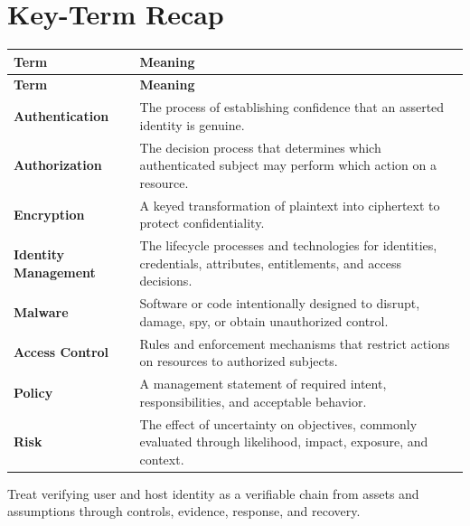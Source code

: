 \documentclass[11pt]{article}
\begin{document}
\section*{Key-Term Recap}
\begin{longtable}{>{\RaggedRight\arraybackslash}p{}>{\RaggedRight\arraybackslash}p{}}
\toprule\rowcolor{Navy}\color{white}\textbf{Term} & \color{white}\textbf{Meaning}\\\midrule
\endfirsthead
\toprule\rowcolor{Navy}\color{white}\textbf{Term} & \color{white}\textbf{Meaning}\\\midrule
\endhead
\textbf{Authentication} & The process of establishing confidence that an asserted identity is genuine. \\\midrule
\textbf{Authorization} & The decision process that determines which authenticated subject may perform which action on a resource. \\\midrule
\textbf{Encryption} & A keyed transformation of plaintext into ciphertext to protect confidentiality. \\\midrule
\textbf{Identity Management} & The lifecycle processes and technologies for identities, credentials, attributes, entitlements, and access decisions. \\\midrule
\textbf{Malware} & Software or code intentionally designed to disrupt, damage, spy, or obtain unauthorized control. \\\midrule
\textbf{Access Control} & Rules and enforcement mechanisms that restrict actions on resources to authorized subjects. \\\midrule
\textbf{Policy} & A management statement of required intent, responsibilities, and acceptable behavior. \\\midrule
\textbf{Risk} & The effect of uncertainty on objectives, commonly evaluated through likelihood, impact, exposure, and context. \\\midrule
\bottomrule
\end{longtable}
\begin{takeawaybox}
Treat verifying user and host identity as a verifiable chain from assets and assumptions through controls, evidence, response, and recovery.
\end{takeawaybox}
\end{document}

